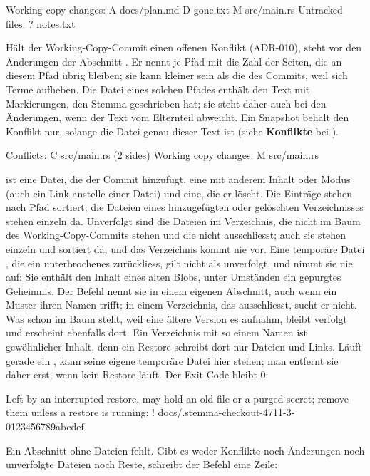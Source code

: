 \starttyping
Working copy changes:
A docs/plan.md
D gone.txt
M src/main.rs
Untracked files:
? notes.txt
\stoptyping

Hält der Working-Copy-Commit einen offenen Konflikt (ADR-010), steht vor den Änderungen der
Abschnitt . Er nennt je Pfad mit  die Zahl der Seiten, die an diesem
Pfad übrig bleiben; sie kann kleiner sein als die des Commits, weil sich Terme aufheben.
Die Datei eines solchen Pfades enthält den Text mit Markierungen, den Stemma geschrieben hat;
sie steht daher auch bei den Änderungen, wenn der Text vom Elternteil abweicht.
Ein Snapshot behält den Konflikt nur, solange die Datei genau dieser Text ist
(siehe {\bf Konflikte} bei ).

\starttyping
Conflicts:
C src/main.rs (2 sides)
Working copy changes:
M src/main.rs
\stoptyping

 ist eine Datei, die der Commit hinzufügt,  eine mit anderem Inhalt oder
Modus (auch ein Link anstelle einer Datei) und  eine, die er löscht.
Die Einträge stehen nach Pfad sortiert; die Dateien eines hinzugefügten oder gelöschten
Verzeichnisses stehen einzeln da.
Unverfolgt sind die Dateien im Verzeichnis, die nicht im Baum des Working-Copy-Commits stehen
und die  nicht ausschliesst; auch sie stehen einzeln und sortiert da,
und das Verzeichnis  kommt nie vor.
Eine temporäre Datei , die ein unterbrochenes 
zurückliess, gilt nicht als unverfolgt, und  nimmt sie nie auf: Sie enthält den Inhalt
eines alten Blobs, unter Umständen ein gepurgtes Geheimnis. Der Befehl nennt sie in einem eigenen
Abschnitt, auch wenn ein Muster ihren Namen trifft; in einem Verzeichnis, das 
ausschliesst, sucht er nicht. Was schon im Baum steht, weil eine ältere Version es aufnahm, bleibt
verfolgt und erscheint ebenfalls dort. Ein Verzeichnis mit so einem Namen ist gewöhnlicher Inhalt,
denn ein Restore schreibt dort nur Dateien und Links. Läuft gerade ein , kann
seine eigene temporäre Datei hier stehen; man entfernt sie daher erst, wenn kein Restore läuft.
Der Exit-Code bleibt 0:

\starttyping
Left by an interrupted restore, may hold an old file or a purged secret; remove them unless a
restore is running:
! docs/.stemma-checkout-4711-3-0123456789abcdef
\stoptyping

Ein Abschnitt ohne Dateien fehlt. Gibt es weder Konflikte noch Änderungen noch unverfolgte
Dateien noch Reste, schreibt der Befehl eine Zeile:

